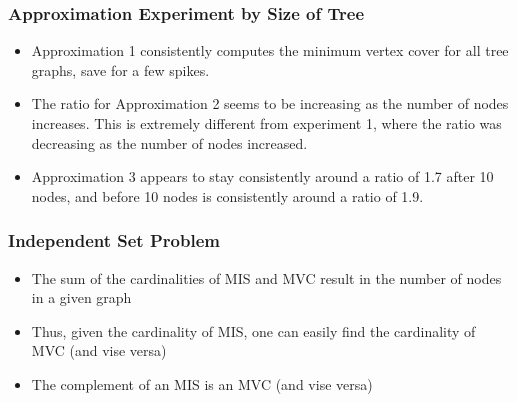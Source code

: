 \documentclass[12pt]{article}
\begin{document}
  \subsubsection{Approximation Experiment by Size of Tree}
  
  \begin{itemize}
      \item Approximation 1 consistently computes the minimum vertex cover for all tree graphs, save for a few spikes.
      \item The ratio for Approximation 2 seems to be increasing as the number of nodes increases. This is extremely different from experiment 1, where the ratio was decreasing as the number of nodes increased.
      \item Approximation 3 appears to stay consistently around a ratio of 1.7 after 10 nodes, and before 10 nodes is consistently around a ratio of 1.9.
  \end{itemize}
  

\subsubsection{Independent Set Problem}
  \begin{itemize}
    \item The sum of the cardinalities of MIS and MVC result in the number of nodes in a given graph
    \item Thus, given the cardinality of MIS, one can easily find the cardinality of MVC (and vise versa)
    \item The complement of an MIS is an MVC (and vise versa)
  \end{itemize}
\end{document}
